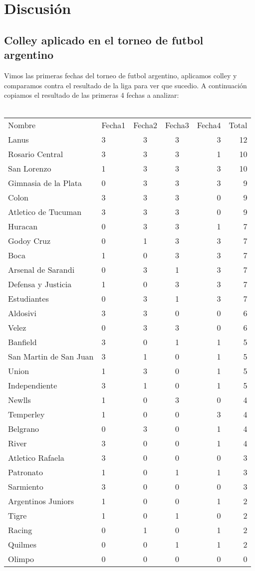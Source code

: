 \section{Discusi\'on}

\subsection{Colley aplicado en el torneo de futbol argentino}

Vimos las primeras fechas del torneo de futbol argentino, aplicamos colley y comparamos contra el resultado de la liga para ver que sucedio. A continuaci\'on copiamos el resultado de las primeras 4 fechas a analizar: \\
\\

\begin{tabular}{l l c c r r}

Nombre & Fecha1 & Fecha2 &	Fecha3 &	Fecha4 &	Total \\
Lanus &	3 &	3 &	3 &	3 &	12 \\
Rosario Central &	3 &	3 &	3 &	1 &	10 \\
San Lorenzo &	1 &	3 &	3 &	3 &	10 \\
Gimnasia de la Plata &	0 &	3 &	3 &	3 &	9 \\
Colon	& 3 &	3 &	3 &	0 &	9 \\
Atletico de Tucuman &	3 &	3 &	3 &	0	 & 9 \\
Huracan &	0 &	3 &	3 &	1 &	7 \\
Godoy Cruz &	0 &	1 &	3 &	3 &	7 \\ 
Boca &	1	 & 0 &	3 &	3 &	7 \\
Arsenal de Sarandi	& 0 &	3 &	1 &	3 &	7 \\
Defensa y Justicia &	1 &	0 &	3 &	3 &	7 \\
Estudiantes &	0 &	3 &	1 &	3 &	7 \\
Aldosivi	& 3 &	3 &	0 &	0 &	6 \\
Velez &	0 &	3 &	3 &	0 &	6 \\
Banfield	& 3 &	0 &	1 &	1 &	5 \\
San Martin de San Juan & 3 &	1 &	0 &	1 &	5 \\
Union & 1 &	3 &	0 &	1 &	5 \\
Independiente &	3 &	1 &	0 &	1 &	5 \\
Newlls & 1 &	0 &	3 &	0 &	4 \\
Temperley &	1 &	0 &	0 &	3 &	4 \\
Belgrano &	0 &	3 &	0 &	1 &	4 \\
River &	3 &	0 &	0 &	1 &	4 \\
Atletico Rafaela &	3 &	0 &	0 &	0 &	3 \\
Patronato &	1 &	0 &	1 &	1 &	3 \\
Sarmiento & 3 &	0 &	0 &	0 &	3 \\
Argentinos Juniors & 	1 &	0 &	0 &	1 &	2 \\
Tigre	 & 1 &	0 &	1 &	0 &	2 \\
Racing &	0 &	1 &	0 &	1 &	2 \\
Quilmes &	0 &	0 &	1 &	1 & 	2 \\
Olimpo &	0 &	0 &	0 &	0 &	0 \\
\end{tabular}

